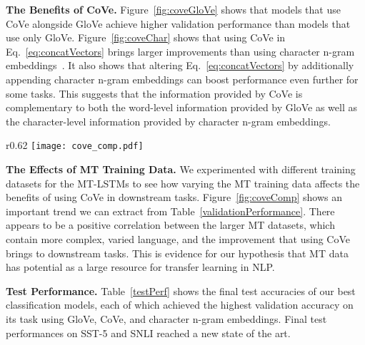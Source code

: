 \textbf{The Benefits of CoVe.}
Figure~\ref{fig:coveGloVe} shows that models that use CoVe alongside GloVe achieve higher validation performance than models that use only GloVe.
Figure~\ref{fig:coveChar} shows that using CoVe in Eq.~\ref{eq:concatVectors} brings larger improvements than using character n-gram embeddings~\citep{Hashimoto2016AJM}. It also shows that altering Eq.~\ref{eq:concatVectors} by additionally appending character n-gram embeddings can boost performance even further for some tasks.
This suggests that the information provided by CoVe is complementary to both the word-level information provided by GloVe as well as the character-level information provided by character n-gram embeddings.


\begin{wrapfigure}[16]{r}{0.62\textwidth}
\vspace{-5.5mm}
  \centering
  \texttt{[image: cove\_comp.pdf]}
  \caption{The Effects of MT Training Data
  }
\label{fig:coveComp}
\end{wrapfigure}

\textbf{The Effects of MT Training Data.}
We experimented with different training datasets for the MT-LSTMs to see how varying the MT training data affects the benefits of using CoVe in downstream tasks.
Figure~\ref{fig:coveComp} shows an important trend we can extract from Table~\ref{validationPerformance}. 
There appears to be a positive correlation between the larger MT datasets,
which contain more complex, varied language, 
and the improvement that using CoVe brings to downstream tasks.
This is evidence for our hypothesis that MT data has potential as a large resource for transfer learning in NLP.

\textbf{Test Performance.} 
Table~\ref{testPerf} shows the final test accuracies of our best classification models, 
each of which achieved the highest validation accuracy on its task using GloVe, CoVe, and character n-gram embeddings.
Final test performances on SST-5 and SNLI reached a new state of the art.

